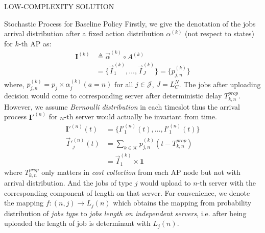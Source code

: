 \documentclass[10pt, conference, letterpaper]{IEEEtran}
\newcommand{\vecOne}{\mathbf{1}}
\begin{document}
\begin{section}{LOW-COMPLEXITY SOLUTION}
\begin{subsection}{Stochastic Process for Baseline Policy}
            Firstly, we give the denotation of the jobs arrival distribution after a fixed action distribution $\alpha^{(k)}$ (not respect to states) for $k$-th AP as:
            \begin{align}
                \mathbf{I}^{(k)} &\triangleq \vec{\alpha}^{(k)} \circ A^{(k)}
                \nonumber\\
                &= \{ \vec{I}^{(k)}_{1}, \dots, \vec{I}^{(k)}_{J} \} = \{p^{(k)}_{j,n}\}
            \end{align}
            where, $p^{(k)}_{j,n} = p_j \times \alpha^{(k)}_j(a=n)$ for all $j \in \mathcal{J}$, $J=L_C^N$.
            The jobs after uploading decision would come to corresponding server after deterministic delay $T^{prop}_{k,n}$. However, we assume \emph{Bernoulli distribution} in each timeslot thus the arrival process $\mathbf{I}'^{(n)}$ for $n$-th server would actually be invariant from time.
            \begin{align}
                \mathbf{I}'^{(n)}(t) & = \{I'^{(n)}_1(t), \dots, I'^{(n)}_1(t) \}
                \\
                \vec{I}'^{(n)}_j(t) & = \sum_{k \in \mathcal{K}} p^{(k)}_{j,n}(t - T^{prop}_{k,n})
                \nonumber\\
                & = \vec{I}^{(k)}_{1} \times \vecOne
            \end{align}
            where $T^{prop}_{k,n}$ only matters in \emph{cost collection} from each AP node but not with arrival distribution. And the jobs of type $j$ would upload to $n$-th server with the corresponding component of length on that server. For convenience, we denote the mapping $f: (n,j) \to L_j(n)$ which obtains the mapping from probability distribution of \emph{jobs type} to \emph{jobs length on independent servers}, i.e. after being uploaded the length of job is determinant with $L_j(n)$.


\end{subsection}
\end{section}
\end{document}
